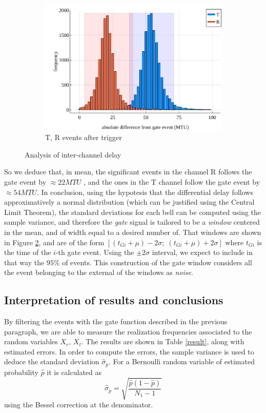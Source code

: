 \documentclass[10pt, final]{article}
\begin{document}
\begin{multicols}{2}
\begin{mdframed}
\begin{figure}[H]
        \begin{subfigure}{\textwidth}
            \centering
            \includegraphics[width = \textwidth]{../images/after.pdf}
            \caption{T, R events after trigger}
            \label{after}
        \end{subfigure}
        \caption{Analysis of inter-channel delay}
    \end{figure}
\end{mdframed}
So we deduce that, in mean, the significant events in the channel R follows the gate event by $\approx 22 MTU$ , and the ones in the T channel follow the gate event by $\approx 54 MTU$.
In conclusion, using the hypotesis that the differential delay follows approximatively  a normal distribution (which can be justified using the Central Limit Theorem), the standard deviations for each bell can be computed using the sample variance, and therefore the \emph{gate} signal is tailored to be a \emph{window} centered in the mean, and of width equal to a desired number of. That windows are shown in Figure \ref{after}, and are of the form $[(t_{Gi} + \mu) -2\sigma; \; (t_{Gi} + \mu) + 2\sigma]$ where $t_{Gi}$ is the time of the $i$-th gate event. Using the $\pm 2 \sigma$ interval, we expect to include in that way the $95\%$ of events. This construction of the gate window considers all the event belonging to the external of the windows as \emph{noise}.  

\subsection*{Interpretation of results and conclusions}
By filtering the events with the gate function described in the previous paragraph, we are able to measure the realization frequencies associated to the random variables $X_r, \, X_t$. The results are shown in Table \ref{result}, along with estimated errors.
In order to compute the errors, the sample variance is used to deduce the standard deviation $\hat{\sigma}_{p}$. For a Bernoulli random variable of estimated probability $\hat{p}$ it is calculated as
\begin{equation*}
    \hat{\sigma}_{p} = \sqrt{\frac{\hat{p}(1-\hat{p})}{N_1-1}}
\end{equation*}
using the Bessel correction at the denominator.


\end{multicols}
\end{document}
